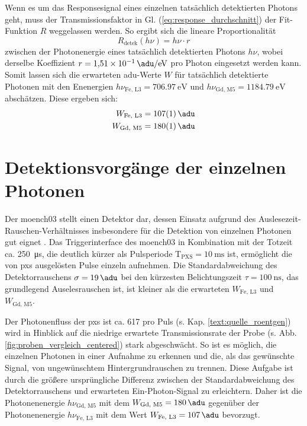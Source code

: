 \noindent
Wenn es um das Responsesignal eines einzelnen tatsächlich detektierten Photons geht, muss der Transmissionsfaktor in Gl. (\ref{eq:response_durchschnitt}) der Fit-Funktion $R$ weggelassen werden. So ergibt sich die lineare Proportionalität
\begin{equation}
    R_\text{detek}(h\nu) = h\nu \cdot r
    \label{eq:adu_to_ev}
\end{equation}
zwischen der Photonenergie eines tatsächlich detektierten Photons $h\nu$, wobei derselbe Koeffizient $r = \SI{1.51e-1}{\adu\per\eV}$ pro Photon eingesetzt werden kann. Somit lassen sich die erwarteten \gls{adu}-Werte $W$ für tatsächlich detektierte Photonen mit den Enenergien $h\nu_{\text{Fe, L3}} = \SI{706.97}{\eV}$ und $h\nu_{\text{Gd, M5}} = \SI{1184.79}{\eV}$ abschätzen. Diese ergeben sich:
\begin{equation}
\begin{split}
     W_{\text{Fe, L3}} &=  \SI{107(1)}{\adu}\\
     W_{\text{Gd, M5}} &=  \SI{180(1)}{\adu}
\end{split}
\label{eq:auselesewerte_fe_gd}
\end{equation}


\section{Detektionsvorgänge der einzelnen Photonen}
\label{text:single_photon_theorie}
Der \gls{moench03} stellt einen Detektor dar, dessen Einsatz aufgrund des Auslesezeit-Rauschen-Ver\-hält\-nis\-ses insbesondere für die Detektion von einzelnen Photonen gut eignet \cite{bergamaschi_monch_2018}. Das Triggerinterface des \gls{moench03} in Kombination mit der Totzeit ca. \SI{250}{\micro\second}, die deutlich kürzer als Pulsperiode T$_\text{PXS} = \SI{10}{\milli\second}$ ist, ermöglicht die von \gls{pxs} ausgelösten Pulse einzeln aufnehmen. Die Standardabweichung des Detektorrauschens $\sigma = \SI{19}{\adu}$ bei den kürzesten Belichtungszeit $\tau = \SI{100}{\nano\second}$, das grundlegend Auselesrauschen ist, ist kleiner als die erwarteten $W_{\text{Fe, L3}}$ und $W_{\text{Gd, M5}}$.

\noindent
Der Photonenfluss der \gls{pxs} ist ca. \SI{617}{\photons} pro Puls (s. Kap. \ref{text:quelle_roentgen}) wird in Hinblick auf die niedrige erwartete Transmissionsrate der Probe (s. Abb. \ref{fig:proben_vergleich_centered}) stark abgeschwächt. So ist es möglich, die einzelnen Photonen in einer Aufnahme zu erkennen und die, als das gewünschte Signal, von ungewünschtem Hintergrundrauschen zu trennen. Diese Aufgabe ist durch die größere ursprüngliche Differenz zwischen der Standardabweichung des Detektorrauschens und erwarteten Ein-Photon-Signal zu erleichtern. Daher ist die Photonenenergie $h\nu_\text{Gd, M5}$ mit dem $W_{\text{Gd, M5}} = \SI{180}{\adu}$ gegenüber der Photonenenergie $h\nu_\text{Fe, L3}$ mit dem Wert $W_{\text{Fe, L3}} = \SI{107}{\adu}$ bevorzugt.

